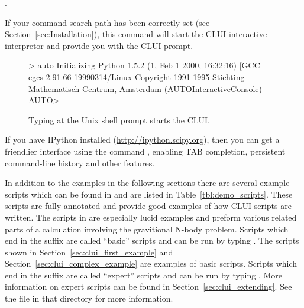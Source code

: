 \documentclass[12pt]{report}
\begin{document}
 \centerline {.}

 If your command search path has been correctly set (see
 Section~\ref{sec:Installation}), this command will start the \AUTO CLUI
 interactive interpretor and provide you with the \AUTO CLUI prompt.

 \begin{figure}[htbp]
 {\small 
 \begin{center} \begin{boxedverbatim}
 > auto
 Initializing
 Python 1.5.2 (1, Feb  1 2000, 16:32:16)  [GCC egcs-2.91.66 19990314/Linux 
 Copyright 1991-1995 Stichting Mathematisch Centrum, Amsterdam
 (AUTOInteractiveConsole)
 AUTO> 
 \end{boxedverbatim}
 \end{center}
 }
 \caption[Starting the \AUTO CLUI.]
 {Typing  at the Unix shell prompt starts the
 \AUTO CLUI.  }
 \label{exa:clui_starting}
 \end{figure}

 If you have IPython installed (\url{http://ipython.scipy.org}), then
 you can get a friendlier interface using the command
 , enabling TAB completion, persistent command-line
 history and other features.

 In addition to the examples in the following sections there are
 several example scripts which can be found in
  and are listed in
 Table~\ref{tbl:demo_scripts}.  These scripts are fully annotated and
 provide good examples of how \AUTO CLUI scripts are written.  The
 scripts in  are especially lucid
 examples and preform various related parts of a calculation involving
 the gravitional N-body problem.  
 Scripts which end in the
 suffix  are called ``basic'' scripts and can
 be run by typing .
 The scripts shown in Section~\ref{sec:clui_first_example}
 and Section~\ref{sec:clui_complex_example} are examples
 of basic scripts.
 Scripts which end in the
 suffix  are called ``expert'' scripts and can
 be run by typing .
 More information on expert scripts can be 
 found in Section~\ref{sec:clui_extending}.
 See the  file in that
 directory for more information.
\end{document}
